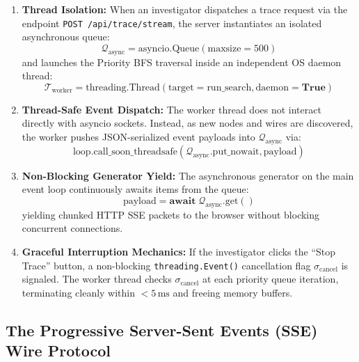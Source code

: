 \begin{enumerate}
    \item \textbf{Thread Isolation:} When an investigator dispatches a trace request via the endpoint \nolinkurl{POST /api/trace/stream}, the server instantiates an isolated asynchronous queue:
    \begin{equation}
        \mathcal{Q}_{\text{async}} = \text{asyncio.Queue}(\text{maxsize}=500)
    \end{equation}
    and launches the Priority BFS traversal inside an independent OS daemon thread:
    \begin{equation}
        \mathcal{T}_{\text{worker}} = \text{threading.Thread}(\text{target}=\text{run\_search}, \text{daemon}=\mathbf{True})
    \end{equation}
    
    \item \textbf{Thread-Safe Event Dispatch:} The worker thread does not interact directly with asyncio sockets. Instead, as new nodes and wires are discovered, the worker pushes JSON-serialized event payloads into $\mathcal{Q}_{\text{async}}$ via:
    \begin{equation}
        \text{loop.call\_soon\_threadsafe}(\mathcal{Q}_{\text{async}}.\text{put\_nowait}, \text{payload})
    \end{equation}
    
    \item \textbf{Non-Blocking Generator Yield:} The asynchronous generator on the main event loop continuously awaits items from the queue:
    \begin{equation}
        \text{payload} = \mathbf{await}\;\mathcal{Q}_{\text{async}}.\text{get}()
    \end{equation}
    yielding chunked HTTP SSE packets to the browser without blocking concurrent connections.
    
    \item \textbf{Graceful Interruption Mechanics:} If the investigator clicks the ``Stop Trace'' button, a non-blocking \texttt{threading.Event()} cancellation flag $\sigma_{\text{cancel}}$ is signaled. The worker thread checks $\sigma_{\text{cancel}}$ at each priority queue iteration, terminating cleanly within $<5\,\text{ms}$ and freeing memory buffers.
\end{enumerate}

\subsection{The Progressive Server-Sent Events (SSE) Wire Protocol}

